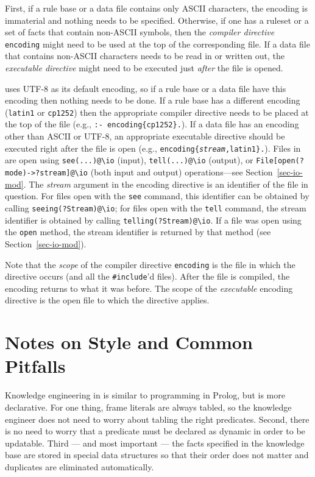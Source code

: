 \documentclass[11pt]{article}
\newcommand{\ERGO}{\mbox{\smaller{\ensuremath{\cal{E}}\smaller{{\sc{RGO}}}}}\xspace}
\newcommand{\FLSYSTEM}{\ERGO}
\newcommand{\bs}{\textbackslash}
\begin{document}
First, if a rule base or a data file contains only ASCII characters,
the encoding is immaterial and nothing needs to be specified.  Otherwise,
if one has a ruleset or a set of \FLSYSTEM facts that contain non-ASCII
symbols, then the \emph{compiler directive} \texttt{encoding} might need to be
used at the top of the corresponding file.  If a data file that contains
non-ASCII characters needs to be read in or written out, the
\emph{executable directive} might need to
be executed just \emph{after}   the file is opened.

\FLSYSTEM uses UTF-8 as its default encoding, so if a rule base or a data
file have this encoding then nothing needs to be done. If a rule base has a
different encoding (\texttt{latin1} or \texttt{cp1252})
then the appropriate compiler directive needs to be placed at the top of
the file (e.g., \texttt{:- encoding\{cp1252\}.}).
If a data file has an encoding other than ASCII or UTF-8, an appropriate
executable directive should be executed right after the file is open (e.g., 
\texttt{encoding\{\textnormal{\textit{stream}},latin1\}.}).
Files in \FLSYSTEM are open using
\texttt{see(...)@\bs{}io} (input), \texttt{tell(...)@\bs{}io} (output), or
\texttt{File[open(?mode)->?stream]@\bs{}io} (both input and output)
operations---see Section~\ref{sec-io-mod}.
The \emph{stream} argument in the encoding directive is an identifier of
the file in question. For files open with the \texttt{see} command,
this identifier
can be obtained by calling \texttt{seeing(?Stream)@\bs{}io};
for files open with the
\texttt{tell} command, the stream identifier is obtained by
calling \texttt{telling(?Stream)@\bs{}io}. If a file was open using the
\texttt{open} method, the stream identifier is returned by that method
(see Section~\ref{sec-io-mod}). 

Note that the \emph{scope} of the compiler directive \texttt{encoding} is
the file in which the directive occurs (and all the \verb|#include|'d files). After the file is compiled,
the encoding returns to what it was before.
The scope of the \emph{executable} encoding directive 
is the open file to which the directive applies.


\section{Notes on Style and Common Pitfalls}

Knowledge engineering
in \FLSYSTEM is similar to programming in Prolog, but is more
declarative. For one thing, frame literals are always tabled, so the
knowledge engineer does not need to worry about tabling the right predicates.
Second, there is no need to worry that a predicate must be declared as
dynamic in order to be updatable. Third --- and most important --- the facts 
specified in the knowledge base are stored in special data structures so
that their order does not matter and duplicates are eliminated automatically. 
\end{document}
